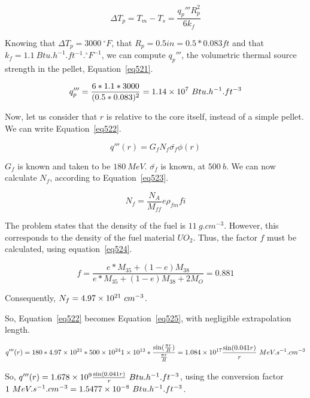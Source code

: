 \begin{equation}\label{eq520}
\Delta T_p = T_m - T_s = \frac{q_p'''R_p^2}{6k_f}
\end{equation}


Knowing that $\Delta T_p = 3000\ {}^\circ F$, that $R_p = 0.5 in = 0.5*0.083 ft$ and that $k_f = 1.1\ Btu.h^{-1}.ft^{-1}.{}^\circ F^{-1}$, we can compute $q_p'''$, the volumetric thermal source strength in the pellet, Equation~\ref{eq521}.

\begin{equation}\label{eq521}
q_p''' = \frac{6*1.1*3000}{(0.5*0.083)^2} = \text{\num{1.14e7}}\ Btu.h^{-1}.ft^{-3}
\end{equation}

Now, let us consider that $r$ is relative to the core itself, instead of a simple pellet. We can write Equation~\ref{eq522}.

\begin{equation}\label{eq522}
q'''(r) = G_f N_f \bar{\sigma_f} \phi(r)
\end{equation}

$G_f$ is known and taken to be $180\ MeV$. $\bar{\sigma_f}$ is known, at $500\ b$. We can now calculate $N_f$, according to Equation~\ref{eq523}.

\begin{equation}\label{eq523}
N_f = \frac{N_A}{M_{ff}}e\rho_{fm}fi
\end{equation}

The problem states that the density of the fuel is $11\ g.cm^{-3}$. However, this corresponds to the density of the fuel material $UO_2$. Thus, the factor $f$ must be calculated, using equation~\ref{eq524}.


\begin{equation}\label{eq524}
f = \frac{e*M_{35} + (1-e)M_{38}}{e*M_{35} + (1-e)M_{38} + 2M_O} = 0.881
\end{equation}

Consequently, $N_f = \text{\num{4.97e21}}\ cm^{-3}$.

So, Equation~\ref{eq522} becomes Equation~\ref{eq525}, with negligible extrapolation length.


\begin{equation}\label{eq525}
q'''(r) = 180 * \text{\num{4.97e21}} * \text{\num{500e24}} \text{\num{1e13}} * \frac{\sin(\frac{\pi r}{R})}{\frac{\pi r}{R}} = \text{\num{1.084e17}} \frac{\sin(0.041r)}{r}\ MeV.s^{-1}.cm^{-3}
\end{equation}

So, $q'''(r) = \text{\num{1.678e9}} \frac{\sin(0.041r)}{r}\ Btu.h^{-1}.ft^{-3}$, using the conversion factor $1\ MeV.s^{-1}.cm^{-3} = \text{\num{1.5477e-8}}\ Btu.h^{-1}.ft^{-3}$.


